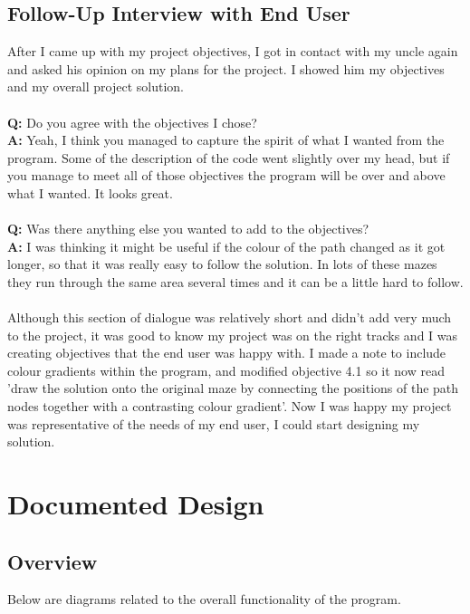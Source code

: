 \documentclass[titlepage]{article}
\begin{document}
\subsection{Follow-Up Interview with End User}
After I came up with my project objectives, I got in contact with my uncle again and asked his opinion on my plans for the project. I showed him my objectives and my overall project solution.
\\\\
\textbf{Q:} Do you agree with the objectives I chose?
\\
\textbf{A:} Yeah, I think you managed to capture the spirit of what I wanted from the program. Some of the description of the code went slightly over my head, but if you manage to meet all of those objectives the program will be over and above what I wanted. It looks great.
\\\\
\textbf{Q:} Was there anything else you wanted to add to the objectives?\\
\textbf{A:} I was thinking it might be useful if the colour of the path changed as it got longer, so that it was really easy to follow the solution. In lots of these mazes they run through the same area several times and it can be a little hard to follow.
\\\\
Although this section of dialogue was relatively short and didn't add very much to the project, it was good to know my project was on the right tracks and I was creating objectives that the end user was happy with. I made a note to include colour gradients within the program, and modified objective 4.1 so it now read 'draw the solution onto the original maze by connecting the positions of the path nodes together with a contrasting colour gradient'. Now I was happy my project was representative of the needs of my end user, I could start designing my solution.

\pagebreak
\section{Documented Design}
\subsection{Overview}
Below are diagrams related to the overall functionality of the program. 
\end{document}
